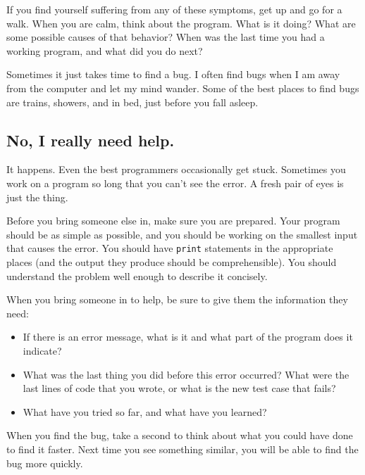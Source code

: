 \documentclass[10pt]{book}
\begin{document}
\begin{CJK}{UTF8}{gbsn}
\begin{itemize}
\end{itemize}

If you find yourself suffering from any of these symptoms, get
up and go for a walk.  When you are calm, think about the program.
What is it doing?  What are some possible causes of that
behavior?  When was the last time you had a working program,
and what did you do next?

Sometimes it just takes time to find a bug.  I often find bugs
when I am away from the computer and let my mind wander.  Some
of the best places to find bugs are trains, showers, and in bed,
just before you fall asleep.


\subsection{No, I really need help.}

It happens.  Even the best programmers occasionally get stuck.
Sometimes you work on a program so long that you can't see the
error.  A fresh pair of eyes is just the thing.

Before you bring someone else in, make sure you are prepared.
Your program should be as simple
as possible, and you should be working on the smallest input
that causes the error.  You should have {\tt print} statements in the
appropriate places (and the output they produce should be
comprehensible).  You should understand the problem well enough
to describe it concisely.

When you bring someone in to help, be sure to give
them the information they need:

\begin{itemize}

\item If there is an error message, what is it
and what part of the program does it indicate?

\item What was the last thing you did before this error occurred?
What were the last lines of code that you wrote, or what is
the new test case that fails?

\item What have you tried so far, and what have you learned?

\end{itemize}

When you find the bug, take a second to think about what you
could have done to find it faster.  Next time you see something
similar, you will be able to find the bug more quickly.


\end{CJK}
\end{document}
